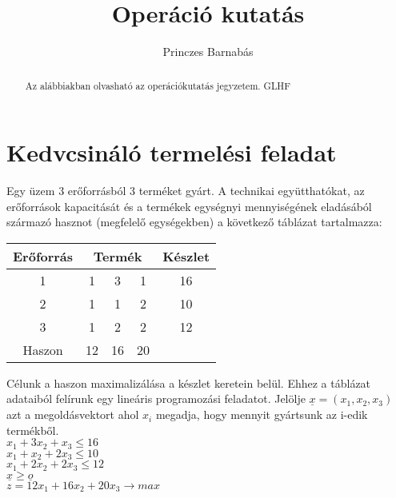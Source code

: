 \documentclass{article}
\title{Operáció
kutatás}
\author{Princzes
Barnabás}
\theoremstyle{mytheoremstyle}
\theoremstyle{mytheoremstyle}
\theoremstyle{myproblemstyle}
\begin{document}
  \maketitle
  \begin{abstract}
    Az alábbiakban olvasható az operációkutatás jegyzetem.
    GLHF
  \end{abstract}

  \section{Kedvcsináló termelési feladat}
  Egy üzem 3 erőforrásból 3 terméket gyárt. A technikai
  együtthatókat, az erőforrások kapacitását és a
  termékek egységnyi mennyiségének eladásából
  származó hasznot (megfelelő egységekben) a
  következő táblázat tartalmazza:

  \begin{center}
    \begin{tabular}{ccccc}
      Erőforrás       & \multicolumn{3}{c}{Termék} & Készlet \\
      \midrule 1      & 1                          & 3      & 1 & 16 \\
      2               & 1                          & 1      & 2 & 10 \\
      3               & 1                          & 2      & 2 & 12 \\
      \midrule Haszon & 12                         & 16     & 20 \\
    \end{tabular}
  \end{center}
  Célunk a haszon maximalizálása a készlet
  keretein belül. Ehhez a táblázat adataiból felírunk
  egy lineáris programozási feladatot. Jelölje
  $\underline{x}=(x_{1},x_{2},x_{3})$ azt a
  megoldásvektort ahol $x_{i}$ megadja, hogy mennyit
  gyártsunk az i-edik termékből.\\ $x_{1}+3x_{2}+x_{3}
  \leq16$\\ $x_{1}+x_{2}+2x_{3}\leq10$\\ $x_{1}+2x_{2}
  +2x_{3}\leq12$\\$\underline{x}\geq\underline{o}$\\
  $z=12x_1+16x_2+20x_3 \to{max}$\\
\end{document}
